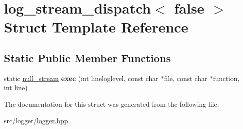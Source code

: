 \hypertarget{structlog__stream__dispatch_3_01false_01_4}{\section{log\-\_\-stream\-\_\-dispatch$<$ false $>$ Struct Template Reference}
\label{structlog__stream__dispatch_3_01false_01_4}
}
\subsection*{Static Public Member Functions}
\begin{DoxyCompactItemize}
\item 
\hypertarget{structlog__stream__dispatch_3_01false_01_4_accfe8195c68b2e1aa975608fd5720e84}{static \hyperlink{structnull__stream}{null\-\_\-stream} {\bfseries exec} (int lineloglevel, const char $\ast$file, const char $\ast$function, int line)}\label{structlog__stream__dispatch_3_01false_01_4_accfe8195c68b2e1aa975608fd5720e84}

\end{DoxyCompactItemize}


The documentation for this struct was generated from the following file\-:\begin{DoxyCompactItemize}
\item 
src/logger/\hyperlink{logger_8hpp}{logger.\-hpp}\end{DoxyCompactItemize}
